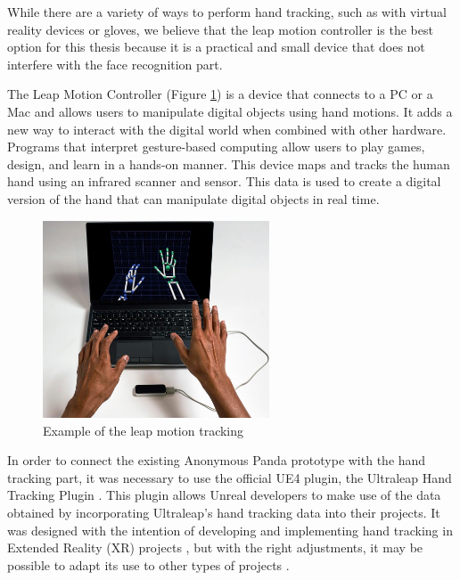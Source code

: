 While there are a variety of ways to perform hand tracking, such as with virtual reality devices or gloves, we believe that the leap motion controller is the best option for this thesis because it is a practical and small device that does not interfere with the face recognition part.

The Leap Motion Controller (Figure \ref{fig:exampleLeap}) is a device that connects to a PC or a Mac and allows users to manipulate digital objects using hand motions. It adds a new way to interact with the digital world when combined with other hardware. Programs that interpret gesture-based computing allow users to play games, design, and learn in a hands-on manner. This device maps and tracks the human hand using an infrared scanner and sensor. This data is used to create a digital version of the hand that can manipulate digital objects in real time.

\begin{figure}[!htb]
\includegraphics[width=0.6\textwidth]{figures/leapMotion.jpg}
\centering
\caption{Example of the leap motion tracking}
\label{fig:exampleLeap}
\end{figure}

In order to connect the existing Anonymous Panda prototype with the hand tracking part, it was necessary to use the official UE4 plugin, the Ultraleap Hand Tracking Plugin \cite{ULT}. This plugin allows Unreal developers to make use of the data obtained by incorporating Ultraleap's hand tracking data into their projects. It was designed with the intention of developing and implementing hand tracking in Extended Reality (XR) projects \cite{XR}, but with the right adjustments, it may be possible to adapt its use to other types of projects \cite{ULTG}.



